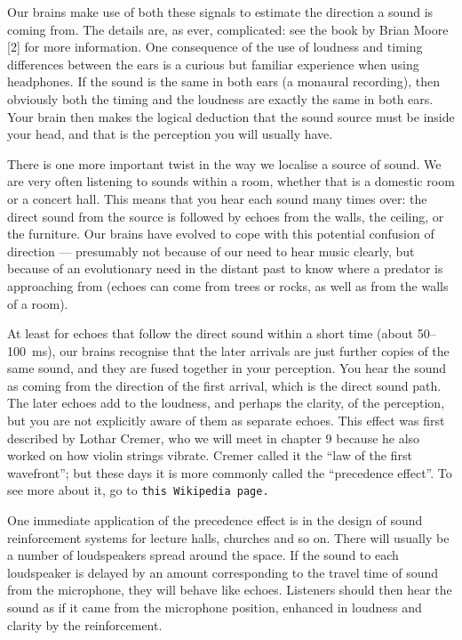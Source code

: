   Our brains make use of both these signals to estimate the direction a sound 
  is coming from. The details are, as ever, complicated: see the book by Brian 
  Moore [2] for more information. One consequence of the use of loudness and 
  timing differences between the ears is a curious but familiar experience when 
  using headphones. If the sound is the same in both ears (a monaural 
  recording), then obviously both the timing and the loudness are exactly the 
  same in both ears. Your brain then makes the logical deduction that the sound 
  source must be inside your head, and that is the perception you will usually 
  have. 

  There is one more important twist in the way we localise a source of sound. 
  We are very often listening to sounds within a room, whether that is a 
  domestic room or a concert hall. This means that you hear each sound many 
  times over: the direct sound from the source is followed by echoes from the 
  walls, the ceiling, or the furniture. Our brains have evolved to cope with 
  this potential confusion of direction — presumably not because of our need to 
  hear music clearly, but because of an evolutionary need in the distant past 
  to know where a predator is approaching from (echoes can come from trees or 
  rocks, as well as from the walls of a room). 

  At least for echoes that follow the direct sound within a short time (about 
  50--100 ms), our brains recognise that the later arrivals are just further 
  copies of the same sound, and they are fused together in your perception. You 
  hear the sound as coming from the direction of the first arrival, which is 
  the direct sound path. The later echoes add to the loudness, and perhaps the 
  clarity, of the perception, but you are not explicitly aware of them as 
  separate echoes. This effect was first described by Lothar Cremer, who we 
  will meet in chapter 9 because he also worked on how violin strings vibrate. 
  Cremer called it the “law of the first wavefront”; but these days it is more 
  commonly called the “precedence effect”. To see more about it, go to 
  \tt{}this Wikipedia page\rm{}. 

  One immediate application of the precedence effect is in the design of sound 
  reinforcement systems for lecture halls, churches and so on. There will 
  usually be a number of loudspeakers spread around the space. If the sound to 
  each loudspeaker is delayed by an amount corresponding to the travel time of 
  sound from the microphone, they will behave like echoes. Listeners should 
  then hear the sound as if it came from the microphone position, enhanced in 
  loudness and clarity by the reinforcement. 

